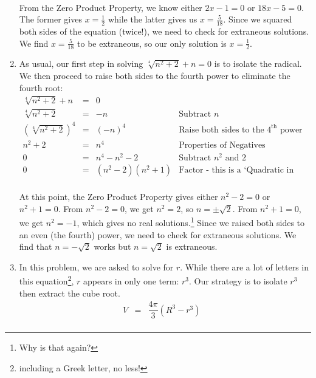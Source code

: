 \documentclass{ximera}
\begin{document}
\begin{example}
\begin{enumerate}
\[\begin{array}{rclr}
\end{array} \] From the Zero Product Property, we know either $2x-1 = 0$ or $18x - 5 = 0$.  The former gives $x = \frac{1}{2}$ while the latter gives us $x = \frac{5}{18}$.  Since we squared both sides of the equation (twice!), we need to check for extraneous solutions.  We find $x = \frac{5}{18}$ to be extraneous, so our only solution is $x = \frac{1}{2}$.

\item As usual, our first step in solving $\sqrt[4]{n^2 + 2} + n = 0$ is to isolate the radical.  We then proceed to raise both sides to the fourth power to eliminate the fourth root:\[ \begin{array}{rclr}

\sqrt[4]{n^2 + 2} + n & = & 0 &  \\

\sqrt[4]{n^2 + 2} & = &  -n & \text{Subtract $n$} \\

(\sqrt[4]{n^2 + 2})^4 & = & (-n)^4 & \text{Raise both sides to the $4^{\text{th}}$ power} \\

n^2 + 2 & = & n^4 & \text{Properties of Negatives}\\

0 & = & n^{4} - n^2 - 2 & \text{Subtract $n^2$ and $2$} \\

0 & = & (n^2 - 2)(n^2 + 1) & \text{Factor - this is a `Quadratic in Disguise'} \\

\end{array} \]

At this point, the Zero Product Property gives either $n^2 - 2 = 0$ or $n^2 + 1 = 0$.  From $n^2 - 2 = 0$, we get $n^2 = 2$, so $n = \pm \sqrt{2}$.  From $n^2 + 1 = 0$, we get $n^2 = -1$, which gives no real solutions.\footnote{Why is that again?}  Since we raised both sides to an even (the fourth) power, we need to check for extraneous solutions. We find that $n = -\sqrt{2}$ works but $n = \sqrt{2}$ is extraneous.

\item In this problem, we are asked to solve for $r$. While there are a lot of letters in this equation\footnote{including a Greek letter, no less!}, $r$ appears in only one term:  $r^3$.  Our strategy is to isolate $r^3$ then extract the cube root.\[ \begin{array}{rclr}

V & = & \dfrac{4\pi}{3}(R^3 - r^3) & \\ [5pt]


\end{array}\]
\end{enumerate}
\end{example}
\end{document}
